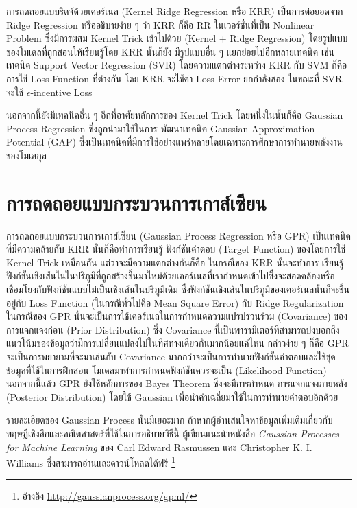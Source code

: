 การถดถอยแบบริดจ์ด้วยเคอร์เนล (Kernel Ridge Regression หรือ KRR) เป็นการต่อยอดจาก Ridge Regression หรืออธิบายง่าย ๆ ว่า KRR ก็คือ RR ในเวอร์ชั่นที่เป็น Nonlinear 
Problem ซึ่งมีการผสม Kernel Trick เข้าไปด้วย (Kernel + Ridge Regression) โดยรูปแบบของโมเดลที่ถูกสอนให้เรียนรู้โดย KRR นั้นก็ยัง%
มีรูปแบบอื่น ๆ แยกย่อยไปอีกหลายเทคนิค เช่น เทคนิค Support Vector Regression (SVR) โดยความแตกต่างระหว่าง KRR กับ SVM ก็คือการใช้
Loss Function ที่ต่างกัน โดย KRR จะใช้ค่า Loss Error ยกกำลังสอง ในขณะที่ SVR จะใช้ $\epsilon$-incentive Loss

นอกจากนี้ยังมีเทคนิคอื่น ๆ อีกที่อาศัยหลักการของ Kernel Trick โดยหนึ่งในนั้นก็คือ Gaussian Process Regression ซึ่งถูกนำมาใช้ในการ%
พัฒนาเทคนิค Gaussian Approximation Potential (GAP) ซึ่งเป็นเทคนิคที่มีการใช้อย่างแพร่หลายโดยเฉพาะการศึกษาการทำนายพลังงาน%
ของโมเลกุล

\section{การถดถอยแบบกระบวนการเกาส์เซียน}
\label{sec:gaussian_process}

การถดถอยแบบกระบวนการเกาส์เซียน (Gaussian Process Regression หรือ GPR)  เป็นเทคนิคที่มีความคล้ายกับ KRR นั่นก็คือทำการเรียนรู้
ฟังก์ชันคำตอบ (Target Function) ของโดยการใช้ Kernel Trick เหมือนกัน แต่ว่าจะมีความแตกต่างกันก็คือ ในกรณีของ KRR นั้นจะทำการ%
เรียนรู้ฟังก์ชันเชิงเส้นในในปริภูมิที่ถูกสร้างขึ้นมาใหม่ด้วยเคอร์เนลที่เรากำหนดเข้าไปซึ่งจะสอดคล้องหรือเชื่อมโยงกับฟังก์ชันแบบไม่เป็นเชิงเส้นในปริภูมิเดิม 
ซึ่งฟังก์ชันเชิงเส้นในปริภูมิของเคอร์เนลนั้นก็จะขึ้นอยู่กับ Loss Function (ในกรณีทั่วไปคือ Mean Square Error) กับ Ridge Regularization 
ในกรณีของ GPR นั้นจะเป็นการใช้เคอร์เนลในการกำหนดความแปรปรวนร่วม (Covariance) ของการแจกแจงก่อน (Prior Distribution) 
ซึ่ง Covariance นี้เป็นพารามิเตอร์ที่สามารถบ่งบอกถึงแนวโน้มของข้อมูลว่ามีการเปลี่ยนแปลงไปในทิศทางเดียวกันมากน้อยแค่ไหน 
กล่าวง่าย ๆ ก็คือ GPR จะเป็นการพยายามที่จะมาเล่นกับ Covariance มากกว่าจะเป็นการทำนายฟังก์ชันคำตอบและใช้ชุดข้อมูลที่ใช้ในการฝึกสอน%
โมเดลมาทำการกำหนดฟังก์ชันควรจะเป็น (Likelihood Function) นอกจากนี้แล้ว GPR ยังใช้หลักการของ Bayes Theorem ซึ่งจะมีการกำหนด%
การแจกแจงภายหลัง (Posterior Distribution) โดยใช้ Gaussian เพื่อนำค่าเฉลี่ยมาใช้ในการทำนายคำตอบอีกด้วย

รายละเอียดของ Gaussian Process นั้นมีเยอะมาก ถ้าหากผู้อ่านสนใจหาข้อมูลเพิ่มเติมเกี่ยวกับทฤษฎีเชิงลึกและคณิตศาสตร์ที่ใช้ในการอธิบายวิธีนี้
ผู้เขียนแนะนำหนังสือ \textit{Gaussian Processes for Machine Learning} ของ Carl Edward Rasmussen และ 
Christopher K. I. Williams ซึ่งสามารถอ่านและดาวน์โหลดได้ฟรี \footnote{อ้างอิง \url{http://gaussianprocess.org/gpml/}}

